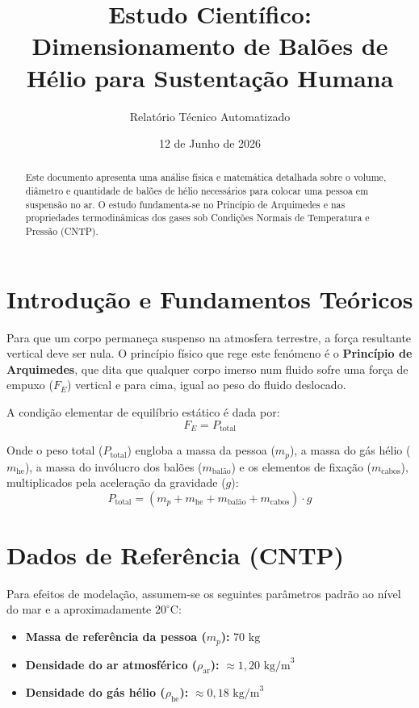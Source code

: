 \documentclass[11pt,a4paper]{article}
\title{Estudo Científico: Dimensionamento de Balões de Hélio para Sustentação Humana}
\author{Relatório Técnico Automatizado}
\date{12 de Junho de 2026}
\begin{document}
	
	\maketitle
	
	\begin{abstract}
		Este documento apresenta uma análise física e matemática detalhada sobre o volume, diâmetro e quantidade de balões de hélio necessários para colocar uma pessoa em suspensão no ar. O estudo fundamenta-se no Princípio de Arquimedes e nas propriedades termodinâmicas dos gases sob Condições Normais de Temperatura e Pressão (CNTP).
	\end{abstract}
	
	\section{Introdução e Fundamentos Teóricos}
	Para que um corpo permaneça suspenso na atmosfera terrestre, a força resultante vertical deve ser nula. O princípio físico que rege este fenómeno é o \textbf{Princípio de Arquimedes}, que dita que qualquer corpo imerso num fluido sofre uma força de empuxo ($F_E$) vertical e para cima, igual ao peso do fluido deslocado.
	
	A condição elementar de equilíbrio estático é dada por:
	\begin{equation}
		F_E = P_{\text{total}}
	\end{equation}
	
	Onde o peso total ($P_{\text{total}}$) engloba a massa da pessoa ($m_p$), a massa do gás hélio ($m_{\text{he}}$), a massa do invólucro dos balões ($m_{\text{balão}}$) e os elementos de fixação ($m_{\text{cabos}}$), multiplicados pela aceleração da gravidade ($g$):
	\begin{equation}
		P_{\text{total}} = (m_p + m_{\text{he}} + m_{\text{balão}} + m_{\text{cabos}}) \cdot g
	\end{equation}
	
	\section{Dados de Referência (CNTP)}
	Para efeitos de modelação, assumem-se os seguintes parâmetros padrão ao nível do mar e a aproximadamente $20^\circ\text{C}$:
	\begin{itemize}
		\item \textbf{Massa de referência da pessoa ($m_p$):} $70\text{ kg}$
		\item \textbf{Densidade do ar atmosférico ($\rho_{\text{ar}}$):} $\approx 1,20\text{ kg/m}^3$
		\item \textbf{Densidade do gás hélio ($\rho_{\text{he}}$):} $\approx 0,18\text{ kg/m}^3$
	\end{itemize}
	
\end{document}

